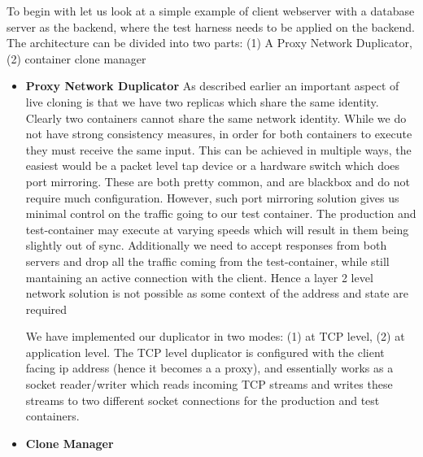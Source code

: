 To begin with let us look at a simple example of client webserver with a database server as the backend, where the test harness needs to be applied on the backend.
The architecture can be divided into two parts: (1) A Proxy Network Duplicator, (2) container clone manager

\begin{itemize} 

\item \textbf{Proxy Network Duplicator} As described earlier an important aspect of live cloning is that we have two replicas which share the same identity.
Clearly two containers cannot share the same network identity. 
While we do not have strong consistency measures, in order for both containers to execute they must receive the same input.
This can be achieved in multiple ways, the easiest would be a packet level tap device or a hardware switch which does port mirroring. 
These are both pretty common, and are blackbox and do not require much configuration.
However, such port mirroring solution gives us minimal control on the traffic going to our test container.
The production and test-container may execute at varying speeds which will result in them being slightly out of sync.
Additionally we need to accept responses from both servers and drop all the traffic coming from the test-container, while still mantaining an active connection with the client.
Hence a layer 2 level network solution is not possible as some context of the address and state are required

We have implemented our duplicator in two modes: (1) at TCP level, (2) at application level.
The TCP level duplicator is configured with the client facing ip address (hence it becomes  a a proxy), and essentially works as a socket reader/writer which reads incoming TCP streams and writes these streams to two different socket connections for the production and test containers.


\item \textbf{Clone Manager} 

\end{itemize}
